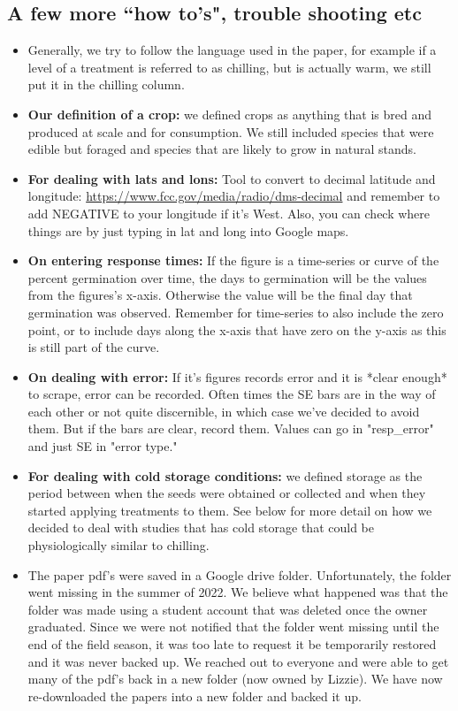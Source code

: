 \documentclass{article}[12pt]
\begin{document}
\subsection*{A few more ``how to's", trouble shooting etc} 
 \begin{itemize}
 \item Generally, we try to follow the language used in the paper, for example if a level of a treatment is referred to as chilling, but is actually warm, we still put it in the chilling column.
 \item \textbf{Our definition of a crop:} we defined crops as anything that is bred and produced at scale and for consumption. We still included species that were edible but foraged and species that are likely to grow in natural stands.
  \item \textbf{For dealing with lats and lons:} Tool to convert to decimal latitude and longitude: \url{https://www.fcc.gov/media/radio/dms-decimal}  and remember to add NEGATIVE to your longitude if it's West. Also, you can check where things are by just typing in lat and long into Google maps. 
\item \textbf{On entering response times:} If the figure is a time-series or curve of the percent germination over time, the days to germination will be the values from the figures's x-axis. Otherwise the value will be the final day that germination was observed. Remember for time-series to also include the zero point, or to include days along the x-axis that have zero on the y-axis as this is still part of the curve. 
\item \textbf{On dealing with error:} If it's figures records error and it is *clear enough* to scrape, error can be recorded. Often times the SE bars are in the way of each other or not quite discernible, in which case we've decided to avoid them. But if the bars are clear, record them. Values can go in "resp\_error" and just SE in "error type."
 \item \textbf{For dealing with cold storage conditions:} we defined storage as the period between when the seeds were obtained or collected and when they started applying treatments to them. See below for more detail on how we decided to deal with studies that has cold storage that could be physiologically similar to chilling.
\item The paper pdf's were saved in a Google drive folder. Unfortunately, the folder went missing in the summer of 2022. We believe what happened was that the folder was made using a student account that was deleted once the owner graduated. Since we were not notified that the folder went missing until the end of the field season, it was too late to request it be temporarily restored and it was never backed up. We reached out to everyone and were able to get many of the pdf's back in a new folder (now owned by Lizzie). We have now re-downloaded the papers into a new folder and backed it up.
\end{itemize}
\end{document}

